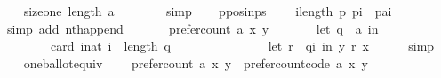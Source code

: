 \begin{isabellebody}
\ \ \isamarkupfalse%
\ size{\isacharunderscore}{\kern0pt}one{\isacharcolon}{\kern0pt}\ {\isachardoublequoteopen}length\ {\isacharbrackleft}{\kern0pt}a{\isacharbrackright}{\kern0pt}\ {\isacharequal}{\kern0pt}\ {}{\isachardoublequoteclose}\isanewline
\ \ \ \ \isamarkupfalse%
\ simp\isanewline
\ \ \isamarkupfalse%
\ p{\isacharunderscore}{\kern0pt}pos{\isacharunderscore}{\kern0pt}in{\isacharunderscore}{\kern0pt}ps{\isacharcolon}{\kern0pt}\isanewline
\ \ \ \ {\isachardoublequoteopen}{\isasymforall}i{\isacharless}{\kern0pt}length\ p{\isachardot}{\kern0pt}\ p{\isacharbang}{\kern0pt}i\ {\isacharequal}{\kern0pt}\ {\isacharparenleft}{\kern0pt}p{\isacharat}{\kern0pt}{\isacharbrackleft}{\kern0pt}a{\isacharbrackright}{\kern0pt}{\isacharparenright}{\kern0pt}{\isacharbang}{\kern0pt}i{\isachardoublequoteclose}\isanewline
\ \ \ \ \isamarkupfalse%
\ {\isacharparenleft}{\kern0pt}simp\ add{\isacharcolon}{\kern0pt}\ nth{\isacharunderscore}{\kern0pt}append{\isacharparenright}{\kern0pt}\isanewline
\ \ \isamarkupfalse%
\isanewline
\ \ \ \ {\isachardoublequoteopen}prefer{\isacharunderscore}{\kern0pt}count\ {\isacharbrackleft}{\kern0pt}a{\isacharbrackright}{\kern0pt}\ x\ y\ {\isacharequal}{\kern0pt}\isanewline
\ \ \ \ \ \ {\isacharparenleft}{\kern0pt}let\ q\ {\isacharequal}{\kern0pt}\ {\isacharbrackleft}{\kern0pt}a{\isacharbrackright}{\kern0pt}\ in\isanewline
\ \ \ \ \ \ \ \ card\ {\isacharbraceleft}{\kern0pt}i{\isacharcolon}{\kern0pt}{\isacharcolon}{\kern0pt}nat{\isachardot}{\kern0pt}\ i\ {\isacharless}{\kern0pt}\ length\ q\ {\isasymand}\isanewline
\ \ \ \ \ \ \ \ \ \ \ \ \ \ {\isacharparenleft}{\kern0pt}let\ r\ {\isacharequal}{\kern0pt}\ {\isacharparenleft}{\kern0pt}q{\isacharbang}{\kern0pt}i{\isacharparenright}{\kern0pt}\ in\ {\isacharparenleft}{\kern0pt}y\ {\isasympreceq}\isactrlsub r\ x{\isacharparenright}{\kern0pt}{\isacharparenright}{\kern0pt}{\isacharbraceright}{\kern0pt}{\isacharparenright}{\kern0pt}{\isachardoublequoteclose}\isanewline
\ \ \ \ \isamarkupfalse%
\ simp\isanewline
\ \ \isamarkupfalse%
\ one{\isacharunderscore}{\kern0pt}ballot{\isacharunderscore}{\kern0pt}equiv{\isacharcolon}{\kern0pt}\isanewline
\ \ \ \ {\isachardoublequoteopen}prefer{\isacharunderscore}{\kern0pt}count\ {\isacharbrackleft}{\kern0pt}a{\isacharbrackright}{\kern0pt}\ x\ y\ {\isacharequal}{\kern0pt}\ prefer{\isacharunderscore}{\kern0pt}count{\isacharunderscore}{\kern0pt}code\ {\isacharbrackleft}{\kern0pt}a{\isacharbrackright}{\kern0pt}\ x\ y{\isachardoublequoteclose}\isanewline

\end{isabellebody}
